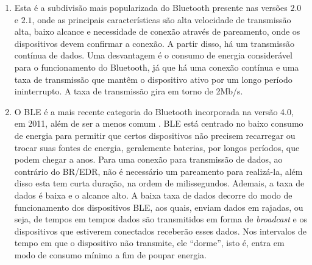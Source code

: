 \begin{enumerate}[label=(\Alph*)]
    
    \item {}
    
    Esta é a subdivisão mais popularizada do Bluetooth presente nas versões $2.0$ e $2.1$, onde as principais características são alta velocidade de transmissão alta, baixo alcance e necessidade de conexão através de pareamento, onde os dispositivos devem confirmar a conexão. A partir disso, há um transmissão contínua de dados. Uma desvantagem é o consumo de energia considerável para o funcionamento do Bluetooth, já que há uma conexão contínua e uma taxa de transmissão que mantêm o dispositivo ativo por um longo período ininterrupto.
    A taxa de transmissão gira em torno de 2Mb/s.
     
    
    \item {}
    
    
    O BLE é a mais recente categoria do Bluetooth incorporada na versão 4.0, em 2011, além de ser a menos comum \cite{LinkLabs2015}.
    BLE está centrado no baixo consumo de energia para permitir que certos dispositivos não precisem recarregar ou trocar suas fontes de energia, geralemente baterias, por longos períodos, que podem chegar a anos. 
    Para uma conexão para transmissão de dados, ao contrário do BR/EDR, não é necessário um pareamento para realizá-la, além disso esta tem curta duração, na ordem de milissegundos.
    Ademais, a taxa de dados é baixa e o alcance alto. A baixa taxa de dados decorre do modo de funcionamento dos dispositivos BLE, aos quais, enviam dados em rajadas, ou seja, de tempos em tempos dados são transmitidos em forma de \textit{broadcast} e os dispositivos que estiverem conectados receberão esses dados. Nos intervalos de tempo em que o dispositivo não transmite, ele ``dorme'', isto é, entra em modo de consumo mínimo a fim de poupar energia.
    

\end{enumerate}
